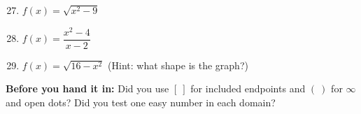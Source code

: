 \documentclass[11pt,letterpaper]{article}
\newif\ifkey
\newcommand{\badge}[2]{\tcbox[on line,colback=#1,colframe=#1,coltext=white,boxrule=0pt,arc=6pt,left=4pt,right=4pt,top=1pt,bottom=1pt,fontupper=\scriptsize\bfseries]{#2}}
\newcommand{\hard}{\badge{FangRed}{HARD}}
\newcommand{\work}[2][]{\ifkey\begin{sol}#2\end{sol}\else\vspace*{#1}\fi}
\newcommand{\np}[1][6cm]{\needspace{#1}}
\begin{document}
 \hard

\begin{enumerate}[resume,leftmargin=*,label=\textbf{\arabic*.},itemsep=6pt]
\setcounter{enumi}{26}
\np\item $f(x)=\sqrt{x^2-9}$
\work[2.2cm]{Need $x^2-9\ge0$, i.e.\ $x^2\ge9$: $x\le-3$ or $x\ge3$. \ Domain $(-\infty,-3]\cup[3,\infty)$. \\ $x^2-9$ takes every value $\ge0$, so Range $[0,\infty)$.}
\np\item $f(x)=\dfrac{x^2-4}{x-2}$
\work[2.2cm]{Domain $x\neq2$. For $x\neq2$, $f(x)=\dfrac{(x-2)(x+2)}{x-2}=x+2$ — a line with a \textbf{hole} at $(2,4)$. \\ So every $y$ except $4$: Range $(-\infty,4)\cup(4,\infty)$.}
\np\item $f(x)=\sqrt{16-x^2}$ \quad (Hint: what shape is the graph?)
\work[2.2cm]{Need $16-x^2\ge0$: Domain $[-4,4]$. The graph is the top half of the circle $x^2+y^2=16$, so it goes from $0$ up to $\sqrt{16}=4$: Range $[0,4]$.}
\end{enumerate}

\ifkey\else
\vfill
\begin{simple}
\textbf{Before you hand it in:} Did you use $[\ ]$ for included endpoints and $(\ )$ for $\infty$ and open dots? Did you test one easy number in each domain?
\end{simple}
\fi
\end{document}
